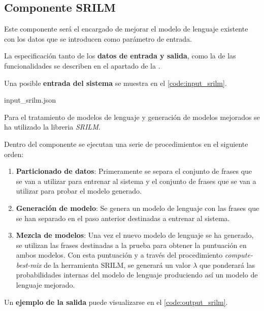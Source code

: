 \documentclass[../main.tex]{subfiles}
\begin{document}


\subsection{Componente SRILM}\label{subsec:impl_srilm}

Este componente será el encargado de mejorar el modelo de lenguaje existente con los datos que se introducen como parámetro de entrada.

La especificación tanto de los \textbf{datos de entrada y salida}, como la de las funcionalidades se describen en el apartado  de la .

Una posible \textbf{entrada del sistema} se muestra en el \autoref{code:input_srilm}.

                {input_srilm.json}
                
Para el tratamiento de modelos de lenguaje y generación de modelos mejorados se ha utilizado la libreria \textit{SRILM}.

Dentro del componente se ejecutan una serie de procedimientos en el siguiente orden:
\begin{enumerate}
    \item \textbf{Particionado de datos}: Primeramente se separa el conjunto de frases que se van a utilizar para entrenar al sistema y el conjunto de frases que se van a utilizar para probar el modelo generado.
    \item \textbf{Generación de modelo}: Se genera un modelo de lenguaje con las frases que se han separado en el paso anterior destinadas a entrenar al sistema.
    \item \textbf{Mezcla de modelos}: Una vez el nuevo modelo de lenguaje se ha generado, se utilizan las frases destinadas a la prueba para obtener la puntuación en ambos modelos. Con esta puntuación y a través del procedimiento \textit{compute-best-mix} de la herramienta SRILM, se generará un valor \( \lambda \) que ponderará las probabilidades internas del modelo de lenguaje produciendo así un modelo de lenguaje mejorado.
\end{enumerate}

Un \textbf{ejemplo de la salida} puede visualizarse en el \autoref{code:output_srilm}.
\end{document}
